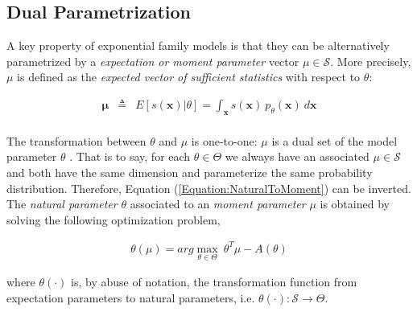 \documentclass[11pt, oneside]{article}   	%
\newcommand{\bm}{\mathbf}
\numberwithin{figure}{section}
\numberwithin{equation}{section}
\numberwithin{table}{section}
\newcommand{\e}[1]{E\left[ #1 \right]}
\theoremstyle{definition}
\begin{document}
\subsection*{Dual Parametrization}
A key property of exponential family models is that they can be alternatively parametrized by a \emph{expectation or moment parameter} vector $\mu \in \mathcal{S}$. More precisely, $\mu$ is defined as the \emph{expected vector of sufficient statistics} with respect to $\theta$:

\begin{equation}
\label{Equation:NaturalToMoment}
\begin{array}{lll}
\bm \mu & \triangleq & \e{s(\bm x)|\theta}  = \int_{\bm x} s(\bm x)~p_\theta(\bm x)~d\bm x\\
\end{array}
\end{equation}

The transformation between $\theta$ and $\mu$ is one-to-one: $\mu$ is a dual set of the model parameter $\theta$ \cite{amari1985differential}. That is to say, for each $\theta\in \Theta$ we always have an associated $\mu\in\mathcal{S}$ and both have the same dimension and parameterize the same probability distribution. Therefore, Equation (\ref{Equation:NaturalToMoment}) can be inverted. The \emph{natural parameter} $\theta$ associated to an \emph{moment parameter} $\mu$ is obtained by solving the following optimization problem,
 
\begin{eqnarray}
\label{Equation:MomentToNatural}
\theta(\mu) = arg\max_{\theta\in\Theta}~\theta^T\mu -A(\theta)
\end{eqnarray}

\noindent where $\theta (\cdot)$ is, by abuse of notation, the transformation function from expectation parameters to natural parameters, i.e. $\theta (\cdot) : \mathcal{S} \rightarrow \Theta$.


\end{document}

